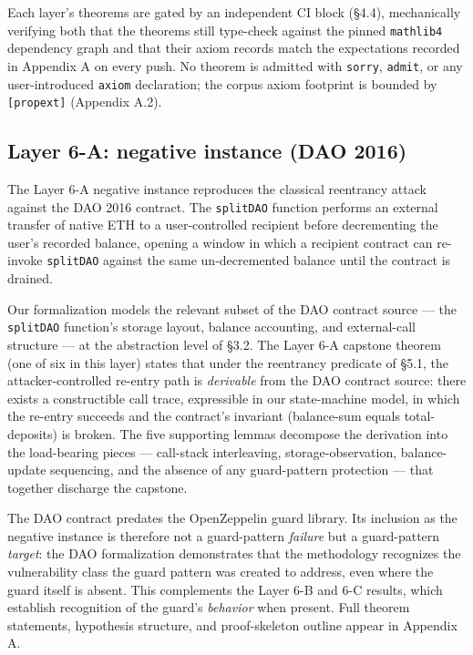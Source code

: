 Each layer's theorems are gated by an independent CI block (§4.4),
mechanically verifying both that the theorems still type-check against
the pinned \texttt{mathlib4} dependency graph and that their axiom
records match the expectations recorded in Appendix A on every push. No
theorem is admitted with \texttt{sorry}, \texttt{admit}, or any
user-introduced \texttt{axiom} declaration; the corpus axiom footprint
is bounded by \texttt{{[}propext{]}} (Appendix A.2).

\subsection{Layer 6-A: negative instance (DAO
2016)}\label{layer-6-a-negative-instance-dao-2016}

The Layer 6-A negative instance reproduces the classical reentrancy
attack against the DAO 2016 contract. The \texttt{splitDAO} function
performs an external transfer of native ETH to a user-controlled
recipient before decrementing the user's recorded balance, opening a
window in which a recipient contract can re-invoke \texttt{splitDAO}
against the same un-decremented balance until the contract is drained.

Our formalization models the relevant subset of the DAO contract source
--- the \texttt{splitDAO} function's storage layout, balance accounting,
and external-call structure --- at the abstraction level of §3.2. The
Layer 6-A capstone theorem (one of six in this layer) states that under
the reentrancy predicate of §5.1, the attacker-controlled re-entry path
is \emph{derivable} from the DAO contract source: there exists a
constructible call trace, expressible in our state-machine model, in
which the re-entry succeeds and the contract's invariant (balance-sum
equals total-deposits) is broken. The five supporting lemmas decompose
the derivation into the load-bearing pieces --- call-stack interleaving,
storage-observation, balance-update sequencing, and the absence of any
guard-pattern protection --- that together discharge the capstone.

The DAO contract predates the OpenZeppelin guard library. Its inclusion
as the negative instance is therefore not a guard-pattern \emph{failure}
but a guard-pattern \emph{target}: the DAO formalization demonstrates
that the methodology recognizes the vulnerability class the guard
pattern was created to address, even where the guard itself is absent.
This complements the Layer 6-B and 6-C results, which establish
recognition of the guard's \emph{behavior} when present. Full theorem
statements, hypothesis structure, and proof-skeleton outline appear in
Appendix A.

